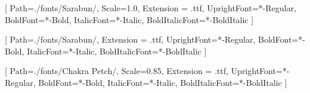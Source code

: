 
% 
% 

\usepackage{float}

\setsansfont{Sarabun}[
    Path=./fonts/Sarabun/,
    Scale=1.0,
    Extension = .ttf,
    UprightFont=*-Regular,
    BoldFont=*-Bold,
    ItalicFont=*-Italic,
    BoldItalicFont=*-BoldItalic
    ]

[
    Path=./fonts/Sarabun/,
    Extension = .ttf,
    UprightFont=*-Regular,
    BoldFont=*-Bold,
    ItalicFont=*-Italic,
    BoldItalicFont=*-BoldItalic
    ]


\setmonofont{ChakraPetch}[
    Path=./fonts/Chakra Petch/,
    Scale=0.85,
    Extension = .ttf,
    UprightFont=*-Regular,
    BoldFont=*-Bold,
    ItalicFont=*-Italic,
    BoldItalicFont=*-BoldItalic
    ]